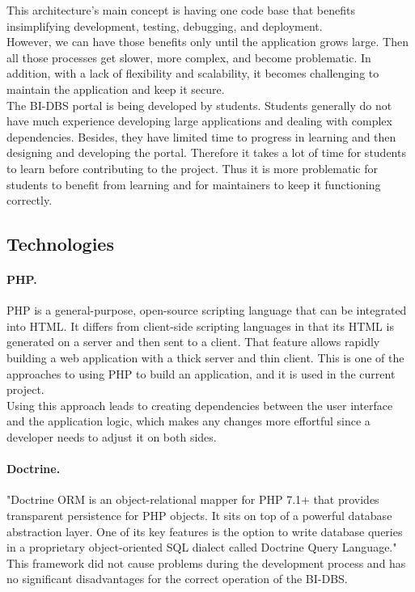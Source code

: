 \noindent This architecture's main concept is having one code base that benefits in\newline simplifying development, testing, debugging, and deployment.\\
However, we can have those benefits only until the application grows large. Then all those processes get slower, more complex, and become problematic. In addition, with a lack of flexibility and scalability, it becomes challenging to maintain the application and keep it secure.\\

\noindent The BI-DBS portal is being developed by students. Students generally do not have much experience developing large applications and dealing with complex dependencies. Besides, they have limited time to progress in learning and then designing and developing the portal. Therefore it takes a lot of time for students to learn before contributing to the project. Thus it is more problematic for students to benefit from learning and for maintainers to keep it functioning correctly.




\subsection{Technologies}
\paragraph*{PHP.} PHP is a general-purpose, open-source scripting language that can be integrated into HTML. \cite{php-doc,html-doc} It differs from client-side scripting languages in that its HTML is generated on a server and then sent to a client. That feature allows rapidly building a web application with a thick server and thin client. This is one of the approaches to using PHP to build an application, and it is used in the current project. \\
Using this approach leads to creating dependencies between the user interface and the application logic, which makes any changes more effortful since a developer needs to adjust it on both sides.

\paragraph*{Doctrine.} "Doctrine ORM is an object-relational mapper for PHP 7.1+ that provides transparent persistence for PHP objects. It sits on top of a powerful database abstraction layer. One of its key features is the option to write database queries in a proprietary object-oriented SQL dialect called Doctrine Query Language." \cite{doctrine-doc}\\ 
This framework did not cause problems during the development process and has no significant disadvantages for the correct operation of the BI-DBS.

